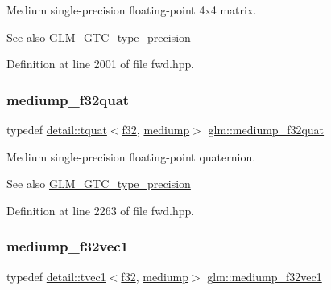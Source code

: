 Medium single-\/precision floating-\/point 4x4 matrix. \begin{DoxySeeAlso}{See also}
\hyperlink{group__gtc__type__precision}{G\+L\+M\+\_\+\+G\+T\+C\+\_\+type\+\_\+precision} 
\end{DoxySeeAlso}


Definition at line 2001 of file fwd.\+hpp.

\mbox{\label{group__gtc__type__precision_gab038e3482ca401bca2b2634c96f44f09}} 
\subsubsection{\texorpdfstring{mediump\+\_\+f32quat}{mediump\_f32quat}}
{\footnotesize\ttfamily typedef \hyperlink{structglm_1_1detail_1_1tquat}{detail\+::tquat}$<$\hyperlink{group__gtc__type__precision_ga0ec999b57f5330d9021256e96038df04}{f32}, \hyperlink{namespaceglm_a0f04f086094c747d227af4425893f545a6416f3ea0c9025fb21ed50c4d6620482}{mediump}$>$ \hyperlink{group__gtc__type__precision_gab038e3482ca401bca2b2634c96f44f09}{glm\+::mediump\+\_\+f32quat}}

Medium single-\/precision floating-\/point quaternion. \begin{DoxySeeAlso}{See also}
\hyperlink{group__gtc__type__precision}{G\+L\+M\+\_\+\+G\+T\+C\+\_\+type\+\_\+precision} 
\end{DoxySeeAlso}


Definition at line 2263 of file fwd.\+hpp.

\mbox{\label{group__gtc__type__precision_gaf3d4077b241fbcab529fb0e0d88c0df6}} 
\subsubsection{\texorpdfstring{mediump\+\_\+f32vec1}{mediump\_f32vec1}}
{\footnotesize\ttfamily typedef \hyperlink{structglm_1_1detail_1_1tvec1}{detail\+::tvec1}$<$\hyperlink{group__gtc__type__precision_ga0ec999b57f5330d9021256e96038df04}{f32}, \hyperlink{namespaceglm_a0f04f086094c747d227af4425893f545a6416f3ea0c9025fb21ed50c4d6620482}{mediump}$>$ \hyperlink{group__gtc__type__precision_gaf3d4077b241fbcab529fb0e0d88c0df6}{glm\+::mediump\+\_\+f32vec1}}

